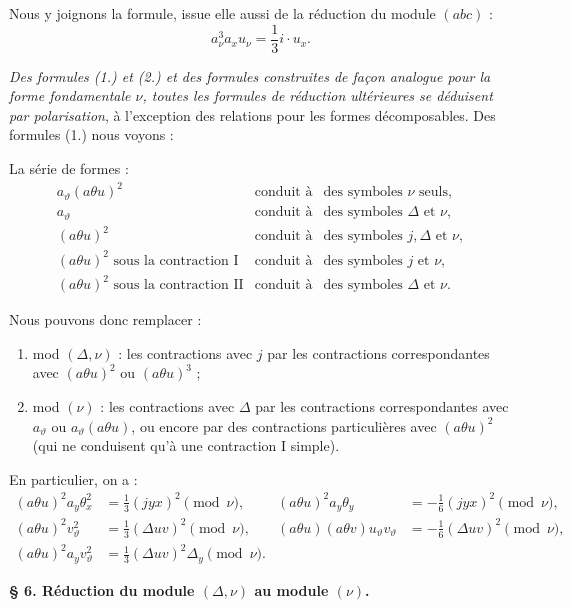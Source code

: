 \documentclass[11pt]{article}
\newcommand{\A}{\Delta}
\begin{document}
Nous y joignons la formule, issue elle aussi de la réduction du module $(abc)$ :
\[
a_\nu^3a_xu_\nu=\frac13 i\cdot u_x. \tag{2}
\]

\emph{Des formules (1.) et (2.) et des formules construites de façon analogue pour la forme fondamentale $\nu$, toutes les formules de réduction ultérieures se déduisent par polarisation}, à l'exception des relations pour les formes décomposables. Des formules (1.) nous voyons :

La série de formes :
\[
\begin{array}{rcl}
a_\vartheta(a\theta u)^2 &\text{conduit à}& \text{des symboles }\nu\text{ seuls},\\[0.2em]
a_\vartheta &\text{conduit à}& \text{des symboles }\A\text{ et }\nu,\\[0.2em]
(a\theta u)^2 &\text{conduit à}& \text{des symboles }j,\A\text{ et }\nu,\\[0.2em]
(a\theta u)^2\text{ sous la contraction I} &\text{conduit à}& \text{des symboles }j\text{ et }\nu,\\[0.2em]
(a\theta u)^2\text{ sous la contraction II} &\text{conduit à}& \text{des symboles }\A\text{ et }\nu.
\end{array}
\]

Nous pouvons donc remplacer :
\begin{enumerate}
\item mod $(\A,\nu)$ : les contractions avec $j$ par les contractions correspondantes avec $(a\theta u)^2$ ou $(a\theta u)^3$ ;
\item mod $(\nu)$ : les contractions avec $\A$ par les contractions correspondantes avec $a_\vartheta$ ou $a_\vartheta(a\theta u)$, ou encore par des contractions particulières avec $(a\theta u)^2$ (qui ne conduisent qu'à une contraction I simple).
\end{enumerate}
En particulier, on a :
\[
\begin{aligned}
(a\theta u)^2a_y\theta_x^2&=\frac13(jyx)^2\pmod{\nu},&
(a\theta u)^2a_y\theta_y&=-\frac16(jyx)^2\pmod{\nu},\\[0.4em]
(a\theta u)^2v_\vartheta^2&=\frac13(\A uv)^2\pmod{\nu},&
(a\theta u)(a\theta v)u_\vartheta v_\vartheta&=-\frac16(\A uv)^2\pmod{\nu},\\[0.4em]
(a\theta u)^2a_yv_\vartheta^2&=\frac13(\A uv)^2\A_y\pmod{\nu}.
\end{aligned}
\]

\begin{center}
\textbf{\S{} 6. \quad Réduction du module $(\A,\nu)$ au module $(\nu)$.}
\end{center}
\end{document}

